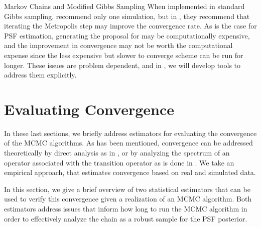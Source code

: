 \begin{chapter}{Markov Chains and Modified Gibbs Sampling}
When implemented in standard Gibbs sampling, \citep{robert2013monte} recommend only one simulation, but in \citep{van2015metropolis}, they recommend that iterating the Metropolis step may improve the convergence rate.
As is the case for PSF estimation, generating the proposal for  may be computationally expensive, and the improvement in convergence may not be worth the computational expense since the less expensive but slower to converge scheme can be run for longer.
These issues are problem dependent, and in , we will develop tools to address them explicitly.


\section{Evaluating Convergence} \label{sec:evaluatingConvergence}

In these last sections, we briefly address estimators for evaluating the convergence of the MCMC algorithms.
As has been mentioned, convergence can be addressed theoretically by direct analysis as in \citep{agapiou2014analysis}, or by analyzing the spectrum of an operator associated with the transition operator as is done in \citep{agapiou2014analysis,van2008partially}.
We take an empirical approach, that estimates convergence based on real and simulated data.

In this section, we give a brief overview of two statistical estimators that can be used to verify this convergence given a realization of an MCMC algorithm.
Both estimators address issues that inform how long to run the MCMC algorithm in order to effectively analyze the chain as a robust sample for the PSF posterior. 


\end{chapter}
